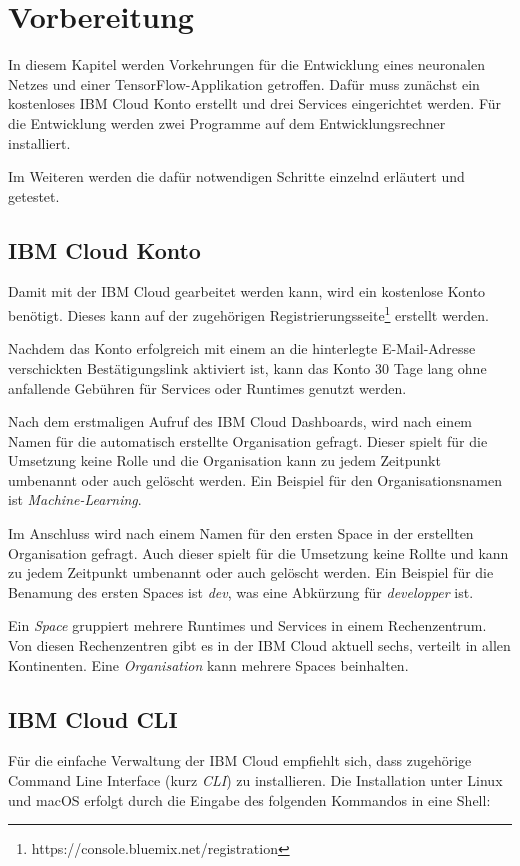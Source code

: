 \section{Vorbereitung}
In diesem Kapitel werden Vorkehrungen für die Entwicklung eines neuronalen Netzes und einer TensorFlow-Applikation
getroffen. Dafür muss zunächst ein kostenloses IBM Cloud Konto erstellt und drei Services eingerichtet werden.
Für die Entwicklung werden zwei Programme auf dem Entwicklungsrechner installiert.

Im Weiteren werden die dafür notwendigen Schritte einzelnd erläutert und getestet.

\subsection{IBM Cloud Konto}
Damit mit der IBM Cloud gearbeitet werden kann, wird ein kostenlose Konto benötigt. Dieses kann auf der zugehörigen
Registrierungsseite\footnote{https://console.bluemix.net/registration} erstellt werden.

Nachdem das Konto erfolgreich mit einem an die hinterlegte E-Mail-Adresse verschickten Bestätigungslink aktiviert ist,
kann das Konto 30 Tage lang ohne anfallende Gebühren für Services oder Runtimes genutzt werden.

Nach dem erstmaligen Aufruf des IBM Cloud Dashboards, wird nach einem Namen für die automatisch erstellte Organisation
gefragt. Dieser spielt für die Umsetzung keine Rolle und die Organisation kann zu jedem Zeitpunkt umbenannt oder auch
gelöscht werden. Ein Beispiel für den Organisationsnamen ist \textit{Machine-Learning}.

Im Anschluss wird nach einem Namen für den ersten Space in der erstellten Organisation gefragt. Auch dieser
spielt für die Umsetzung keine Rollte und kann zu jedem Zeitpunkt umbenannt oder auch gelöscht werden. Ein Beispiel für
die Benamung des ersten Spaces ist \textit{dev}, was eine Abkürzung für \textit{developper} ist.

Ein \textit{Space} gruppiert mehrere Runtimes und Services in einem Rechenzentrum. Von diesen Rechenzentren gibt es in
der IBM Cloud aktuell sechs, verteilt in allen Kontinenten. Eine \textit{Organisation} kann mehrere Spaces beinhalten.

\subsection{IBM Cloud CLI}
Für die einfache Verwaltung der IBM Cloud empfiehlt sich, dass zugehörige Command Line Interface (kurz \textit{CLI}) zu
installieren. Die Installation unter Linux und macOS erfolgt durch die Eingabe des folgenden Kommandos in eine Shell:

